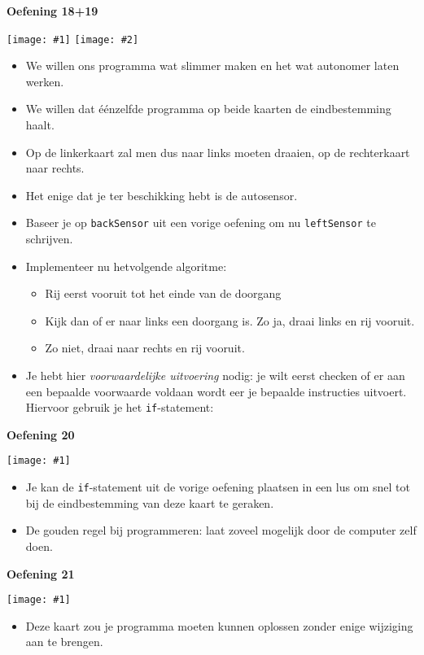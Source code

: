 \documentclass[a4paper]{article}
\newcommand{\newexercise}[1]{\clearpage\begin{center}\Huge\bf #1\end{center}}
\newcommand{\exercisemap}[1]{\begin{center}\texttt{[image: \#1]}\end{center}}
\newcommand{\exercisemaps}[2]{\begin{center}\texttt{[image: \#1]} \hspace{4mm} \texttt{[image: \#2]}\end{center}}
\newcommand{\code}[1]{
  \begin{center}
    \begin{minipage}{.8\linewidth}
      
    \end{minipage}
  \end{center}
}
\begin{document}
\newexercise{Oefening 18+19}
\exercisemaps{ex18}{ex19}
\begin{itemize}
  \item We willen ons programma wat slimmer maken en het wat autonomer laten werken.
  \item We willen dat \'e\'enzelfde programma op beide kaarten de eindbestemming haalt.
  \item Op de linkerkaart zal men dus naar links moeten draaien, op de rechterkaart naar rechts.
  \item Het enige dat je ter beschikking hebt is de autosensor.
  \item Baseer je op \verb'backSensor' uit een vorige oefening om nu
        \verb'leftSensor' te schrijven.
  \item Implementeer nu hetvolgende algoritme:
        \begin{itemize}
          \item Rij eerst vooruit tot het einde van de doorgang
          \item Kijk dan of er naar links een doorgang is. Zo ja, draai links en rij vooruit.
          \item Zo niet, draai naar rechts en rij vooruit.
        \end{itemize}
  \item Je hebt hier \emph{voorwaardelijke uitvoering} nodig: je wilt
        eerst checken of er aan een bepaalde voorwaarde voldaan wordt eer
        je bepaalde instructies uitvoert. Hiervoor gebruik je het \verb'if'-statement:
        \code{if.js}
\end{itemize}


\newexercise{Oefening 20}
\exercisemap{ex20}
\begin{itemize}
  \item Je kan de \verb'if'-statement uit de vorige oefening plaatsen in een lus
        om snel tot bij de eindbestemming van deze kaart te geraken.
  \item De gouden regel bij programmeren: laat zoveel mogelijk door de computer zelf doen.
\end{itemize}


\newexercise{Oefening 21}
\exercisemap{ex21}
\begin{itemize}
  \item Deze kaart zou je programma moeten kunnen oplossen zonder enige wijziging aan te brengen.
\end{itemize}
\end{document}

